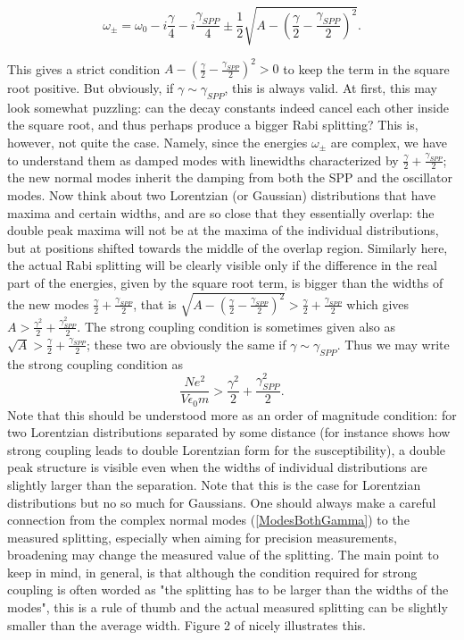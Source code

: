 \documentclass[12pt]{iopart}
\begin{document}
\begin{equation}
\omega_\pm = \omega_0 - i \frac{\gamma}{4} - i \frac{\gamma_{SPP}}{4} \pm \frac{1}{2}\sqrt{A-\left(\frac{\gamma}{2}
-\frac{\gamma_{SPP}}{2}\right)^2}.  \label{ModesBothGamma}
\end{equation}

\noindent This gives a strict condition $A-\left(\frac{\gamma}{2}-\frac{\gamma_{SPP}}{2}\right)^2>0$
to keep the term in the square root positive. But obviously, if $\gamma \sim \gamma_{SPP}$, this is always valid. At first, this may look somewhat puzzling: can the decay constants indeed cancel each other inside the square root, and thus perhaps produce a bigger Rabi splitting? This is, however, not quite the case. Namely, since the energies $\omega_\pm$ are complex, we have to understand them as damped modes with linewidths characterized by $\frac{\gamma}{2} + \frac{\gamma_{SPP}}{2}$; the new normal modes inherit the damping from both the SPP and the oscillator modes. Now think about two Lorentzian (or Gaussian) distributions that have maxima and certain widths, and are so close that they essentially overlap: the double peak maxima will not be at the maxima of the individual distributions, but at positions shifted towards the middle of the overlap region. Similarly here, the actual Rabi splitting will be clearly visible only if the difference in the real part of the energies, given by the square root term, is bigger than the widths of the new modes $\frac{\gamma}{2} + \frac{\gamma_{SPP}}{2}$, that is $\sqrt{A-\left(\frac{\gamma}{2}-\frac{\gamma_{SPP}}{2}\right)^2}>\frac{\gamma}{2} + \frac{\gamma_{SPP}}{2}$ which gives $A>\frac{\gamma^2}{2} + \frac{\gamma^2_{SPP}}{2}$. The strong coupling condition is sometimes given also as $\sqrt{A}>\frac{\gamma}{2} + \frac{\gamma_{SPP}}{2}$; these two are obviously the same if $\gamma \sim \gamma_{SPP}$. Thus we may write the strong coupling condition as
\begin{equation}
\frac{Ne^2}{V\epsilon_0 m} > \frac{\gamma^2}{2}+\frac{\gamma_{SPP}^2}{2}.  \label{Strongcouplingcondition}
\end{equation}
Note that this 
should be understood more as an order of magnitude condition: for two Lorentzian distributions separated by some distance (for instance \cite{Agarwal1984} shows how strong coupling leads to double Lorentzian form for the susceptibility), a double peak structure is visible even when the widths of individual distributions are slightly larger than the separation. Note that this is the case for Lorentzian distributions but no so much for Gaussians. One should always make a careful connection from the complex normal modes (\ref{ModesBothGamma}) to the measured splitting, especially when aiming for precision measurements, broadening
may change the measured value of the splitting. The main point to keep in mind, in general,
is that although the condition required for strong coupling is often worded as 
"the splitting has to be larger than the widths of the modes", this is a rule of thumb and the actual 
measured splitting can be slightly smaller than the average width. Figure 2 of \cite{Khitrova2006} nicely 
illustrates this.     
 
\end{document}
